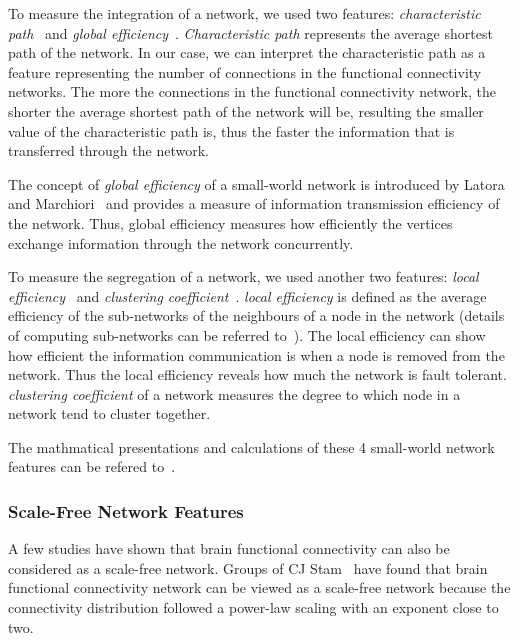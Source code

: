 To measure the integration of a network, we used two features: \emph{characteristic path}~\cite{watts1998collective} and \emph{global efficiency}~\cite{latora2001efficient}. \emph{Characteristic path} represents the average shortest path of the network. In our case, we can interpret the characteristic path as a feature representing the number of connections in the functional connectivity networks. The more the connections in the functional connectivity network, the shorter the average shortest path of the network will be, resulting the smaller value of the characteristic path is, thus the faster the information that is transferred through the network. 

The concept of \emph{global efficiency} of a small-world network is introduced by Latora and Marchiori~\cite{latora2001efficient} and provides a measure of information transmission efficiency of the network. Thus, global efficiency measures how efficiently the vertices exchange information through the network concurrently.

To measure the segregation of a network, we used another two features: \emph{local efficiency}~\cite{watts1998collective} and \emph{clustering coefficient}~\cite{latora2001efficient}. \emph{local efficiency} is defined as the average efficiency of the sub-networks of the neighbours of a node in the network (details of computing sub-networks can be referred to~\cite{ullmann1976algorithm}). The local efficiency can show how efficient the information communication is when a node is removed from the network. Thus the local efficiency reveals how much the network is fault tolerant. \emph{clustering coefficient} of a network measures the degree to which node in a network tend to cluster together. 

The mathmatical presentations and calculations of these 4 small-world network features can be refered to~\cite{rubinov2010complex}.

\subsubsection{Scale-Free Network Features}
A few studies have shown that brain functional connectivity can also be considered as a scale-free network. Groups of CJ Stam~\cite{stam2004functional} have found that brain functional connectivity network can be viewed as a scale-free network because the connectivity distribution followed a power-law scaling with an exponent close to two.


